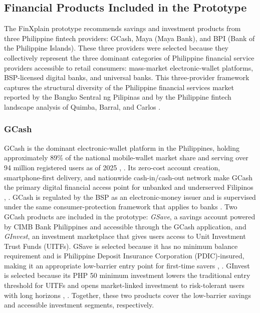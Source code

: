 \documentclass[journal]{./IEEE/IEEEtran}
\begin{document}
\subsection{Financial Products Included in the Prototype}

The FinXplain prototype recommends savings and investment products from three Philippine fintech providers: GCash, Maya (Maya Bank), and BPI (Bank of the Philippine Islands). These three providers were selected because they collectively represent the three dominant categories of Philippine financial service providers accessible to retail consumers: mass-market electronic-wallet platforms, BSP-licensed digital banks, and universal banks. This three-provider framework captures the structural diversity of the Philippine financial services market reported by the Bangko Sentral ng Pilipinas \cite{ref35} and by the Philippine fintech landscape analysis of Quimba, Barral, and Carlos \cite{ref9}.

\subsubsection{GCash}
GCash is the dominant electronic-wallet platform in the Philippines, holding approximately 89\% of the national mobile-wallet market share and serving over 94 million registered users as of 2025 \cite{ref9}, \cite{ref35}. Its zero-cost account creation, smartphone-first delivery, and nationwide cash-in/cash-out network make GCash the primary digital financial access point for unbanked and underserved Filipinos \cite{ref35}, \cite{ref9}. GCash is regulated by the BSP as an electronic-money issuer and is supervised under the same consumer-protection framework that applies to banks \cite{ref35}. Two GCash products are included in the prototype: \emph{GSave}, a savings account powered by CIMB Bank Philippines and accessible through the GCash application, and \emph{GInvest}, an investment marketplace that gives users access to Unit Investment Trust Funds (UITFs). GSave is selected because it has no minimum balance requirement and is Philippine Deposit Insurance Corporation (PDIC)-insured, making it an appropriate low-barrier entry point for first-time savers \cite{ref35}, \cite{ref66}. GInvest is selected because its PHP 50 minimum investment lowers the traditional entry threshold for UITFs and opens market-linked investment to risk-tolerant users with long horizons \cite{ref9}, \cite{ref66}. Together, these two products cover the low-barrier savings and accessible investment segments, respectively.
\end{document}
